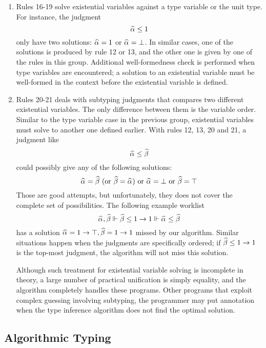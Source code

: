 \begin{enumerate}
    \item Rules 16-19 solve existential variables against a type variable or the unit type.
        For instance, the judgment
        \[\al \le 1\]
        only have two solutions: $\al = 1$ or $\al = \bot$.
        In similar cases, one of the solutions is produced by rule 12 or 13,
        and the other one is given by one of the rules in this group.
        Additional well-formedness check is performed when type variables are encountered;
        a solution to an existential variable must be well-formed in the context
        before the existential variable is defined.
    
    \item Rules 20-21 deals with subtyping judgments
        that compares two different existential variables.
        The only difference between them is the variable order.
        Similar to the type variable case in the previous group,
        existential variables must solve to another one defined earlier.
        With rules 12, 13, 20 and 21, a judgment like
        \[\al \le \bt\]
        could possibly give any of the following solutions:
        \[ \al = \bt ~(\text{or } \bt = \al)
            \text{ or } \al = \bot \text{ or } \bt = \top \]
        Those are good attempts, but unfortunately,
        they does not cover the complete set of possibilities.
        The following example worklist
        \[ \al, \bt \Vdash \bt \le 1 \to 1 \Vdash \al \le \bt \]
        has a solution $\al = 1 \to \top, \bt = 1 \to 1$ missed by our algorithm.
        Similar situations happen when the judgments are specifically ordered;
        if $\bt \le 1 \to 1$ is the top-most judgment,
        the algorithm will not miss this solution.

        Although such treatment for existential variable solving is incomplete in theory,
        a large number of practical unification is simply equality,
        and the algorithm completely handles these programs.
        Other programs that exploit complex guessing involving subtyping,
        the programmer may put annotation when the type inference algorithm
        does not find the optimal solution.
\end{enumerate}


\subsection{Algorithmic Typing}

